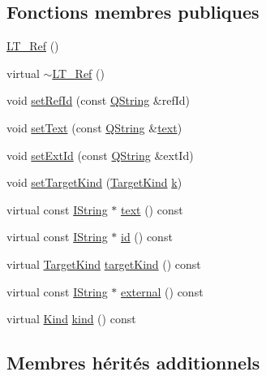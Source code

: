 \subsection*{Fonctions membres publiques}
\begin{DoxyCompactItemize}
\item 
\hyperlink{class_l_t___ref_a2ae6f2cdc0811474069a567655cf1a57}{L\+T\+\_\+\+Ref} ()
\item 
virtual \hyperlink{class_l_t___ref_a9c27357bea04afa98082c0bda1541062}{$\sim$\+L\+T\+\_\+\+Ref} ()
\item 
void \hyperlink{class_l_t___ref_aa58a1fa144b337d4412f461280213764}{set\+Ref\+Id} (const \hyperlink{class_q_string}{Q\+String} \&ref\+Id)
\item 
void \hyperlink{class_l_t___ref_ab32809080285a478f177582906941142}{set\+Text} (const \hyperlink{class_q_string}{Q\+String} \&\hyperlink{class_l_t___ref_afdc72a1577fbe26529791c21eabdd218}{text})
\item 
void \hyperlink{class_l_t___ref_a705a26f4f16c17e4fc0eb22f711dd57a}{set\+Ext\+Id} (const \hyperlink{class_q_string}{Q\+String} \&ext\+Id)
\item 
void \hyperlink{class_l_t___ref_a728f74dfabc691708e49f79e761a04ca}{set\+Target\+Kind} (\hyperlink{class_i_l_t___ref_a76e1fe83459ddebc82bea1930caf674d}{Target\+Kind} \hyperlink{060__command__switch_8tcl_a20363f854eb4098a446733d63d34dbc1}{k})
\item 
virtual const \hyperlink{class_i_string}{I\+String} $\ast$ \hyperlink{class_l_t___ref_afdc72a1577fbe26529791c21eabdd218}{text} () const 
\item 
virtual const \hyperlink{class_i_string}{I\+String} $\ast$ \hyperlink{class_l_t___ref_aeffaba16cb40a0ac789ec1d028609d43}{id} () const 
\item 
virtual \hyperlink{class_i_l_t___ref_a76e1fe83459ddebc82bea1930caf674d}{Target\+Kind} \hyperlink{class_l_t___ref_a034af9564eab83b6f4d3fc0c9f1e7750}{target\+Kind} () const 
\item 
virtual const \hyperlink{class_i_string}{I\+String} $\ast$ \hyperlink{class_l_t___ref_aee94b029262174d16ef62a7a783622fb}{external} () const 
\item 
virtual \hyperlink{class_i_linked_text_af18c37822f4819c58c07b327b459c5af}{Kind} \hyperlink{class_l_t___ref_a446c2bd67ec45107be3e61db98b6cf60}{kind} () const 
\end{DoxyCompactItemize}
\subsection*{Membres hérités additionnels}


